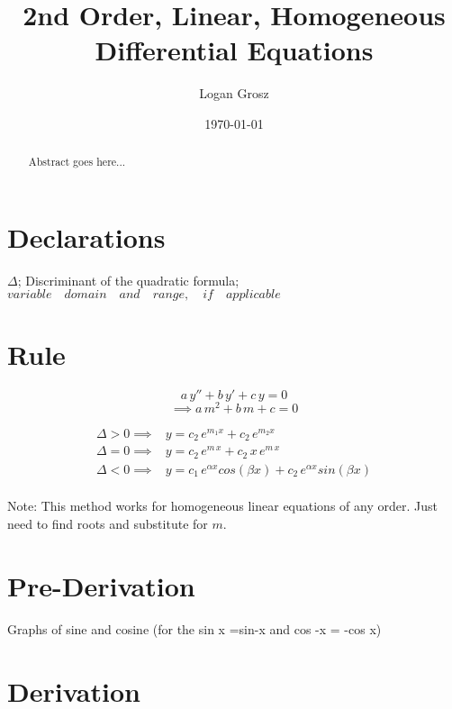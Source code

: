 \documentclass{article}
\begin{document}
	
\author{Logan Grosz}
\title{2nd Order, Linear, Homogeneous Differential Equations}
\date{\today}

\maketitle

\begin{abstract}
	Abstract goes here...
\end{abstract}

\section{Declarations}

$\Delta$; Discriminant of the quadratic formula; $variable\quad domain\quad and\quad range,\quad if\quad applicable$

\section{Rule}

$$a\,y''+b\,y'+c\,y=0$$
$$\implies a\,m^2+b\,m+c=0$$

	\begin{align}
		\Delta>0\implies&y=c_2\,e^{m_1x}+c_2\,e^{m_2x}\\
		\Delta=0\implies&y=c_2\,e^{m\,x}+c_2\,x\,e^{m\,x}\\
		\Delta<0\implies&y=c_1\,e^{\alpha x}cos(\beta x)+c_2\,e^{\alpha x}sin(\beta x)
	\end{align}
\\
\noindent Note: This method works for homogeneous linear equations of any order. Just need to find roots and substitute for $m$.
\section{Pre-Derivation}
Graphs of sine and cosine (for the sin x =sin-x and cos -x = -cos x)

\section{Derivation}
\end{document}
